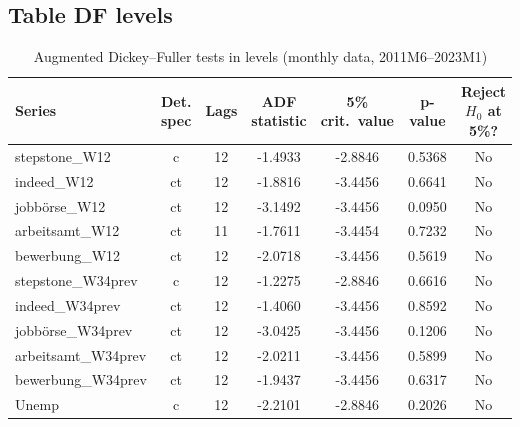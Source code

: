 \documentclass[12pt,a4paper]{article}
\begin{document}
\subsection{Table DF levels}
\begin{table}[htbp]
\centering
\caption{Augmented Dickey--Fuller tests in levels (monthly data, 2011M6--2023M1)}
\label{tab:adf_levels}
\begin{tabular}{lcccccc}
\hline\hline
Series & Det. spec & Lags & ADF statistic & 5\% crit.\ value & p-value & Reject $H_0$ at 5\%? \\
\hline
stepstone\_W12        & c  & 12 & -1.4933 & -2.8846 & 0.5368 & No \\
indeed\_W12           & ct & 12 & -1.8816 & -3.4456 & 0.6641 & No \\
jobbörse\_W12         & ct & 12 & -3.1492 & -3.4456 & 0.0950 & No \\
arbeitsamt\_W12       & ct & 11 & -1.7611 & -3.4454 & 0.7232 & No \\
bewerbung\_W12        & ct & 12 & -2.0718 & -3.4456 & 0.5619 & No \\
stepstone\_W34prev    & c  & 12 & -1.2275 & -2.8846 & 0.6616 & No \\
indeed\_W34prev       & ct & 12 & -1.4060 & -3.4456 & 0.8592 & No \\
jobbörse\_W34prev     & ct & 12 & -3.0425 & -3.4456 & 0.1206 & No \\
arbeitsamt\_W34prev   & ct & 12 & -2.0211 & -3.4456 & 0.5899 & No \\
bewerbung\_W34prev    & ct & 12 & -1.9437 & -3.4456 & 0.6317 & No \\
Unemp                 & c  & 12 & -2.2101 & -2.8846 & 0.2026 & No \\
\hline\hline
\end{tabular}
\end{table}
\end{document}
